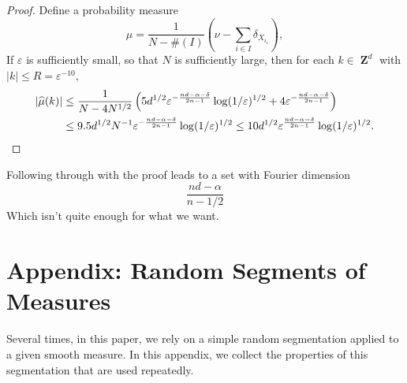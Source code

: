\documentclass[12pt,reqno]{article}
\DeclareMathOperator{\ZZ}{\mathbf{Z}}
\begin{document}
\begin{proof}
    Define a probability measure
    \[ \mu = \frac{1}{N - \#(I)} \left( \nu - \sum_{i \in I} \delta_{X_{i_1}} \right), \]
    If $\varepsilon$ is sufficiently small, so that $N$ is sufficiently large, then for each $k \in \ZZ^d$ with $|k| \leq R = \varepsilon^{-10}$,
    \begin{align*}
        |\widehat{\mu}(k)| &\leq \frac{1}{N - 4N^{1/2}} \left( 5d^{1/2} \varepsilon^{- \frac{nd - \alpha - \delta}{2n - 1}} \log(1/\varepsilon)^{1/2} +  4 \varepsilon^{- \frac{nd - \alpha - \delta}{2n - 1}} \right)\\
        &\leq 9.5 d^{1/2} N^{-1} \varepsilon^{- \frac{nd - \alpha - \delta}{2n - 1}} \log(1/\varepsilon)^{1/2} \leq 10 d^{1/2} \varepsilon^{\frac{nd - \alpha - \delta}{2n - 1}} \log(1/\varepsilon)^{1/2}. \qedhere
    \end{align*}
\end{proof}

Following through with the proof leads to a set with Fourier dimension
%
\[ \frac{nd - \alpha}{n - 1/2} \]
%
Which isn't quite enough for what we want.



\section{Appendix: Random Segments of Measures}

Several times, in this paper, we rely on a simple random segmentation applied to a given smooth measure. In this appendix, we collect the properties of this segmentation that are used repeatedly.
\end{document}
